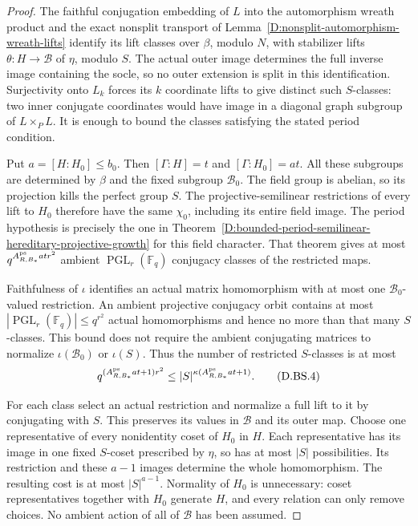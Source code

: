 \begin{proof}
The faithful conjugation embedding of $L$ into the
automorphism wreath product and the exact nonsplit
transport of
Lemma~\ref{D:nonsplit-automorphism-wreath-lifts}
identify its lift classes over $\beta$, modulo $N$,
with stabilizer lifts $\theta:H\to\mathcal B$ of
$\eta$, modulo $S$. The actual outer image determines
the full inverse image containing the socle, so no
outer extension is split in this identification.
Surjectivity onto $L_k$ forces its $k$ coordinate
lifts to give distinct such $S$-classes: two inner
conjugate coordinates would have image in a diagonal
graph subgroup of $L\times_P L$.
It is enough to bound the classes satisfying the
stated period condition.

Put $a=[H:H_0]\le b_0$. Then $[\Gamma:H]=t$ and
$[\Gamma:H_0]=at$. All these subgroups are determined
by $\beta$ and the fixed subgroup $\mathcal B_0$.
The field group is abelian, so its projection kills
the perfect group $S$. The projective-semilinear
restrictions of every lift to $H_0$ therefore have
the same $\chi_0$, including its entire field image.
The period hypothesis is precisely the one in
Theorem~\ref{D:bounded-period-semilinear-hereditary-projective-growth}
for this field character. That theorem gives at most
$q^{A_{R,B_*}^{\rm ps}at r^2}$ ambient
$\operatorname{PGL}_r(\mathbb F_q)$ conjugacy classes
of the restricted maps.

Faithfulness of $\iota$ identifies an actual matrix
homomorphism with at most one $\mathcal B_0$-valued
restriction. An ambient projective conjugacy orbit
contains at most $|\operatorname{PGL}_r(\mathbb F_q)|
\le q^{r^2}$ actual homomorphisms and hence no more
than that many $S$-classes. This bound does not
require the ambient conjugating matrices to normalize
$\iota(\mathcal B_0)$ or $\iota(S)$. Thus the number
of restricted $S$-classes is at most
\[
 q^{(A_{R,B_*}^{\rm ps}at+1)r^2}
             \le |S|^{\kappa(A_{R,B_*}^{\rm ps}at+1)}.
                                                        \tag{D.BS.4}
\]

For each class select an actual restriction and
normalize a full lift to it by conjugating with $S$.
This preserves its values in $\mathcal B$ and its
outer map. Choose one representative of every
nonidentity coset of $H_0$ in $H$. Each representative
has its image in one fixed $S$-coset prescribed by
$\eta$, so has at most $|S|$ possibilities. Its
restriction and these $a-1$ images determine the
whole homomorphism. The resulting cost is at most
$|S|^{a-1}$. Normality of $H_0$ is unnecessary:
coset representatives together with $H_0$ generate
$H$, and every relation can only remove choices.
No ambient action of all of $\mathcal B$ has been
assumed.


\end{proof}
